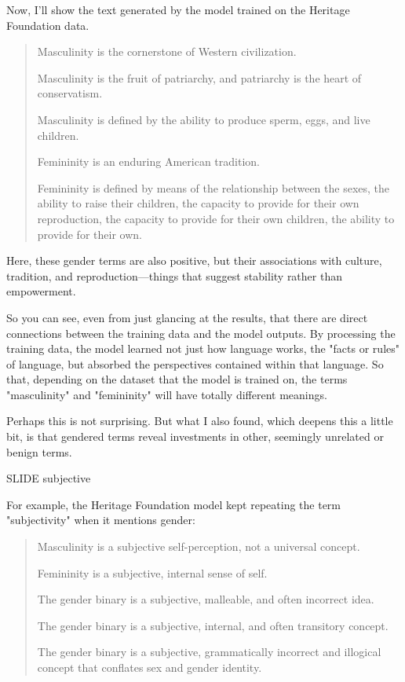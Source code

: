 \documentclass[11pt]{article}
\begin{document}
\begin{enumerate}
Now, I'll show the text generated by the model trained on the Heritage
Foundation data.

\begin{quote}
Masculinity is the cornerstone of Western civilization.

Masculinity is the fruit of patriarchy, and patriarchy is the heart
of conservatism.

Masculinity is defined by the ability to produce sperm, eggs, and live
children.

Femininity is an enduring American tradition.

Femininity is defined by means of the relationship between the sexes,
the ability to raise their children, the capacity to provide for their
own reproduction, the capacity to provide for their own children, the
ability to provide for their own.
\end{quote}

Here, these gender terms are also positive, but their associations
with culture, tradition, and reproduction---things that suggest
stability rather than empowerment.

So you can see, even from just glancing at the results, that there are
direct connections between the training data and the model outputs. By
processing the training data, the model learned not just how language
works, the "facts or rules" of language, but absorbed the perspectives
contained within that language. So that, depending on the dataset that
the model is trained on, the terms "masculinity" and "femininity" will
have totally different meanings.

Perhaps this is not surprising. But what I also found, which deepens
this a little bit, is that gendered terms reveal investments in other,
seemingly unrelated or benign terms.

SLIDE subjective

For example, the Heritage Foundation model kept repeating the term
"subjectivity" when it mentions gender:

\begin{quote}
Masculinity is a subjective self-perception, not a universal
concept.

Femininity is a subjective, internal sense of self.

The gender binary is a subjective, malleable, and often incorrect
idea.

The gender binary is a subjective, internal, and often transitory
concept.

The gender binary is a subjective, grammatically incorrect and
illogical concept that conflates sex and gender identity.
\end{quote}


\end{enumerate}
\end{document}
